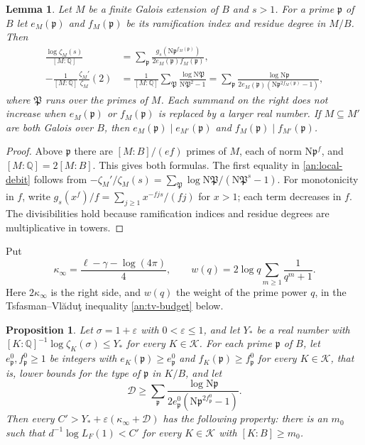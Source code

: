 \documentclass[11pt]{amsart}
\numberwithin{equation}{section}
\newtheorem{proposition}[equation]{Proposition}
\newtheorem{lemma}[equation]{Lemma}
\theoremstyle{definition}
\theoremstyle{remark}
\newcommand{\Q}{\mathbb Q}
\begin{document}
\begin{lemma}\label{an:local-contribution}
Let $M$ be a finite Galois extension of $B$ and $s>1$. For a prime
$\mathfrak p$ of $B$ let $e_M(\mathfrak p)$ and $f_M(\mathfrak p)$ be its
ramification index and residue degree in $M/B$. Then
\begin{align}
 \frac{\log\zeta_M(s)}{[M:\Q]}
 &=\sum_{\mathfrak p}\frac{g_s(\mathrm N\mathfrak p^{f_M(\mathfrak p)})}
 {2e_M(\mathfrak p)f_M(\mathfrak p)},\label{an:local-sum}\\
 -\frac1{[M:\Q]}\frac{\zeta_M'}{\zeta_M}(2)
 &=\frac1{[M:\Q]}\sum_{\mathfrak P}\frac{\log\mathrm N\mathfrak P}
 {\mathrm N\mathfrak P^2-1}
 =\sum_{\mathfrak p}\frac{\log\mathrm N\mathfrak p}
 {2e_M(\mathfrak p)(\mathrm N\mathfrak p^{2f_M(\mathfrak p)}-1)},
 \label{an:local-debit}
\end{align}
where $\mathfrak P$ runs over the primes of $M$. Each summand on the right
does not increase when $e_M(\mathfrak p)$ or $f_M(\mathfrak p)$ is replaced
by a larger real number. If $M\subseteq M'$ are both Galois over $B$, then
$e_M(\mathfrak p)\mid e_{M'}(\mathfrak p)$ and
$f_M(\mathfrak p)\mid f_{M'}(\mathfrak p)$.
\end{lemma}

\begin{proof}
Above $\mathfrak p$ there are $[M:B]/(ef)$ primes of $M$, each of norm
$\mathrm N\mathfrak p^f$, and $[M:\Q]=2[M:B]$. This gives both formulas.
The first equality in \eqref{an:local-debit} follows from
$-\zeta_M'/\zeta_M(s)=\sum_{\mathfrak P}\log\mathrm N\mathfrak P/(\mathrm
N\mathfrak P^s-1)$. For monotonicity in $f$, write
$g_s(x^f)/f=\sum_{j\ge1}x^{-fjs}/(fj)$ for $x>1$; each term decreases in
$f$. The divisibilities hold because ramification indices and residue
degrees are multiplicative in towers.
\end{proof}

Put
\[
 \kappa_\infty=\frac{\ell-\gamma-\log(4\pi)}4,\qquad
 w(q)=2\log q\sum_{m\ge1}\frac1{q^m+1}.
\]
Here $2\kappa_\infty$ is the right side, and $w(q)$ the weight of the prime
power $q$, in the Tsfasman--Vl\u{a}du\c{t} inequality \eqref{an:tv-budget}
below.

\begin{proposition}\label{an:prime-budget}
Let $\sigma=1+\varepsilon$ with $0<\varepsilon\le1$, and let $Y_*$ be a real
number with $[K:\Q]^{-1}\log\zeta_K(\sigma)\le Y_*$ for every
$K\in\mathcal K$. For each prime $\mathfrak p$ of $B$, let
$e^0_{\mathfrak p},f^0_{\mathfrak p}\ge1$ be integers with
$e_K(\mathfrak p)\ge e^0_{\mathfrak p}$ and $f_K(\mathfrak p)\ge
f^0_{\mathfrak p}$ for every $K\in\mathcal K$, that is, lower bounds for
the type of $\mathfrak p$ in $K/B$, and let
\[
 \mathcal D\ge\sum_{\mathfrak p}\frac{\log\mathrm N\mathfrak p}
 {2e^0_{\mathfrak p}(\mathrm N\mathfrak p^{2f^0_{\mathfrak p}}-1)}.
\]
Then every $C'>Y_*+\varepsilon(\kappa_\infty+\mathcal D)$ has the following
property: there is an $m_0$ such that $d^{-1}\log L_F(1)<C'$ for every
$K\in\mathcal K$ with $[K:B]\ge m_0$.
\end{proposition}
\end{document}
